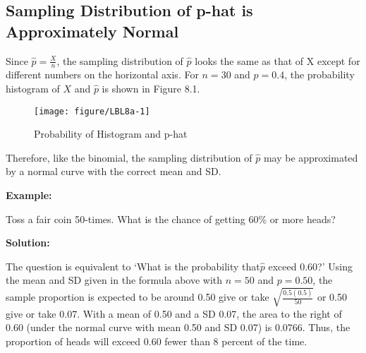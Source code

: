 \documentclass[11pt]{book}\usepackage[]{graphicx}\usepackage[]{color}
\begin{document}
\subsection{Sampling Distribution of p-hat is Approximately Normal}

Since $\hat{p} = \frac{X}{n}$, the sampling distribution of $\hat{p}$ looks the same as that of X except for different numbers on the horizontal axis.  For $n = 30$ and $p = 0.4$, the probability histogram of $X$ and $\hat{p}$ is shown in Figure 8.1.

\newpage

\begin{figure}[ht]

\caption{Probability of Histogram and p-hat}



{\centering \texttt{[image: figure/LBL8a-1]} 

}




\end{figure}

Therefore, like the binomial, the sampling distribution of $\hat{p}$ may be approximated by a normal curve with the correct mean and SD.

\begin{minipage}[ht]{3cm}


\textbf{Example:}
\end{minipage}
\begin{minipage}[ht]{11cm}

\parbox{11cm}{Toss a fair coin 50-times.  What is the chance of getting 60\% or more heads?
}
\end{minipage}

\begin{minipage}[ht]{3cm}

\vspace{-28mm}

\textbf{Solution:}
\end{minipage}
\begin{minipage}[ht]{11cm}

{\parbox{11cm}{
The question is equivalent to `What is the probability that$\hat{p}$ exceed 0.60?'  Using the mean and SD given in the formula above with $n = 50$ and $p = 0.50$, the sample proportion is expected to be around 0.50 give or take $\sqrt{\frac{0.5 (0.5)}{50}}$ or 0.50 give or take 0.07.  With a mean of 0.50 and a SD 0.07, the area to the right of 0.60 (under the normal curve with mean 0.50 and SD 0.07) is 0.0766.  Thus, the proportion of heads will exceed 0.60 fewer than 8 percent of the time.
}}

\end{minipage}
\end{document}
